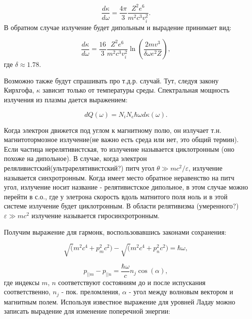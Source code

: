 \documentclass[10pt, a4paper]{article}
\numberwithin{equation}{section}
\begin{document}
\begin{equation}
    \frac{d\kappa}{d\omega}=\frac{4\pi}{3}\frac{Z^2 e^6}{m^2 c^3 v_i^2}.
\end{equation}
В обратном случае излучение будет дипольным и вырадение принимает вид:

\begin{equation}
    \frac{d\kappa}{d\omega}=\frac{16}{3}\frac{Z^2 e^6}{m^2 c^3 v_i^2} \ln\left(\frac{2mv^3}{\delta \omega e^2 Z} \right),
\end{equation}
где $\delta \approx 1.78$.

Возможно также будут спрашивать про т.д.р. случай. Тут, следуя закону Кирхгофа, $\kappa$ зависит только от температуры среды. Спектральная мощность излучения из плазмы дается выражением:

\begin{equation}
    dQ(\omega)=N_i N_e \hbar \omega d\kappa(\omega).
\end{equation}

Когда электрон движется под углом к магнитному полю, он излучает т.н. магнитотормозное излучение(не важно есть среда или
нет, это общий термин). Если частица нерелятивистская, то излучение называется циклотронным (оно похоже на дипольное). В
случае, когда электрон реляливистский(ультрарелятивистский?) питч угол $\theta \gg mc^2/\varepsilon$, излучение
называется синхротронным. Когда имеет место обратное неравенство на питч угол, излучение носит название - релятивистское
дипольное, в этом случае можно перейти в с.о., где у элетрона скорость вдоль матнитого поля ноль и в этой системе
излучение будет циклотронным. В области релятивизма (умеренного?) $\varepsilon\gg mc^2$ излучение называется
гиросинхротронным.

Получим выражение для гармонк, воспользовавшись законами сохранения:

\begin{equation}
    \sqrt(m^2c^4+p_m^2c^2) - \sqrt(m^2c^4+p_n^2c^2)=\hbar \omega,
\end{equation}

\begin{equation}
    p_{|| m} - p_{|| n} = \frac{\hbar\omega}{c}n_j \cos(\alpha),
\end{equation}
где индексы $m$, $n$ соответствуют состояниям до и после испускания соответственно, $n_j$ - пок. преломления, $\alpha$ -
угол между волновым вектором и магнитным полем. Используя известное выражение для уровней Ладау можно записать вырадение
для изменение поперечной энергии:
\end{document}
